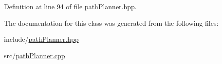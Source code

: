 Definition at line 94 of file path\+Planner.\+hpp.



The documentation for this class was generated from the following files\+:\begin{DoxyCompactItemize}
\item 
include/\hyperlink{path_planner_8hpp}{path\+Planner.\+hpp}\item 
src/\hyperlink{path_planner_8cpp}{path\+Planner.\+cpp}\end{DoxyCompactItemize}
